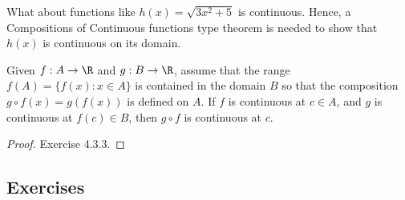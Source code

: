 What about functions like \( h(x) = \sqrt{ 3x^2 + 5  }   \) is continuous. Hence, a Compositions of Continuous functions type theorem is needed to show that \( h(x) \) is continuous on its domain.


\begin{tcolorbox}
    \begin{thm}
    Given \( f: A \to \R  \) and \( g: B \to \R  \), assume that the range \( f(A) = \{ f(x) : x \in A  \}  \) is contained in the domain \( B  \) so that the composition \( g \circ f(x) = g(f(x)) \) is defined on \( A  \). If \( f \) is continuous at \( c \in A  \), and \( g  \) is continuous at \( f(c) \in B  \), then \( g \circ f  \) is continuous at \( c  \).

    \end{thm}
\end{tcolorbox}

\begin{proof}
Exercise 4.3.3.
\end{proof}

\subsection{Exercises}

